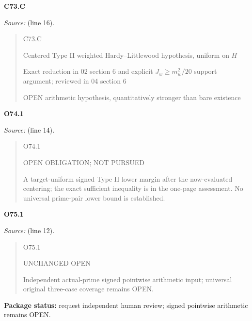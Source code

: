 \documentclass[10pt,a4paper]{article}
\newcommand{\head}[1]{\smallskip\textbf{#1}\par}
\begin{document}
\head{C73.C}\textit{Source:}  (line 16).
\begin{quote}
C73.C

Centered Type II weighted Hardy–Littlewood hypothesis, uniform on $H$

Exact reduction in 02 section 6 and explicit $J_w\ge m_w^2/20$ support argument; reviewed in 04 section 6

OPEN arithmetic hypothesis, quantitatively stronger than bare existence
\end{quote}

\head{O74.1}\textit{Source:}  (line 14).
\begin{quote}
O74.1

OPEN OBLIGATION; NOT PURSUED

A target-uniform signed Type II lower margin after the now-evaluated centering; the exact sufficient inequality is in the one-page assessment. No universal prime-pair lower bound is established.
\end{quote}

\head{O75.1}\textit{Source:}  (line 12).
\begin{quote}
O75.1

UNCHANGED OPEN

Independent actual-prime signed pointwise arithmetic input; universal original three-case coverage remains OPEN.
\end{quote}

\textbf{Package status:} request independent human review; signed pointwise arithmetic remains OPEN.
\end{document}
